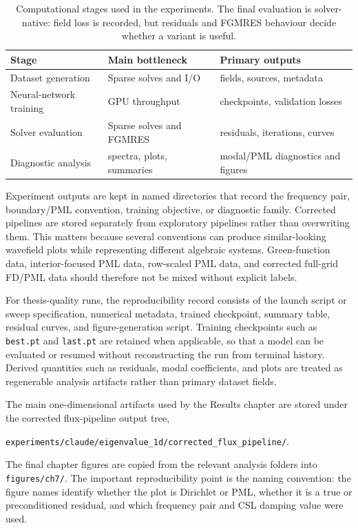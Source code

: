 \begin{table}[htbp]
\centering
\caption{Computational stages used in the experiments. The final evaluation is
solver-native: field loss is recorded, but residuals and FGMRES behaviour
decide whether a variant is useful.}
\label{tab:setup-computational-stages}
\begin{tabular}{lll}
\toprule
Stage & Main bottleneck & Primary outputs \\
\midrule
Dataset generation & Sparse solves and I/O & fields, sources, metadata \\
Neural-network training & GPU throughput & checkpoints, validation losses \\
Solver evaluation & Sparse solves and FGMRES & residuals, iterations, curves \\
Diagnostic analysis & spectra, plots, summaries & modal/PML diagnostics and figures \\
\bottomrule
\end{tabular}
\end{table}

Experiment outputs are kept in named directories that record the frequency
pair, boundary/PML convention, training objective, or diagnostic family.
Corrected pipelines are stored separately from exploratory pipelines rather
than overwriting them. This matters because several conventions can produce
similar-looking wavefield plots while representing different algebraic
systems. Green-function data, interior-focused PML data, row-scaled PML data,
and corrected full-grid FD/PML data should therefore not be mixed without
explicit labels.

For thesis-quality runs, the reproducibility record consists of the launch
script or sweep specification, numerical metadata, trained checkpoint, summary
table, residual curves, and figure-generation script. Training checkpoints
such as \texttt{best.pt} and \texttt{last.pt} are retained when applicable, so
that a model can be evaluated or resumed without reconstructing the run from
terminal history. Derived quantities such as residuals, modal coefficients,
and plots are treated as regenerable analysis artifacts rather than primary
dataset fields.

The main one-dimensional artifacts used by the Results chapter are stored
under the corrected flux-pipeline output tree,
\begin{center}
\texttt{experiments/claude/eigenvalue\_1d/corrected\_flux\_pipeline/}.
\end{center}
The final chapter figures are copied from the relevant analysis folders into
\texttt{figures/ch7/}. The important reproducibility point is the naming
convention: the figure names identify whether the plot is Dirichlet or PML,
whether it is a true or preconditioned residual, and which frequency pair and
CSL damping value were used.

